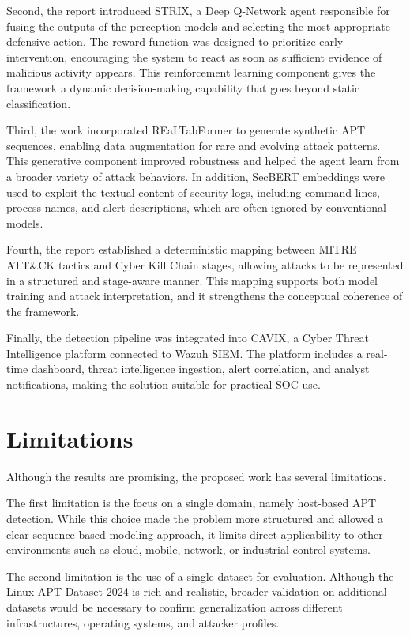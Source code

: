 Second, the report introduced STRIX, a Deep Q-Network agent responsible for fusing the outputs of the perception models and selecting the most appropriate defensive action. The reward function was designed to prioritize early intervention, encouraging the system to react as soon as sufficient evidence of malicious activity appears. This reinforcement learning component gives the framework a dynamic decision-making capability that goes beyond static classification.

Third, the work incorporated REaLTabFormer to generate synthetic APT sequences, enabling data augmentation for rare and evolving attack patterns. This generative component improved robustness and helped the agent learn from a broader variety of attack behaviors. In addition, SecBERT embeddings were used to exploit the textual content of security logs, including command lines, process names, and alert descriptions, which are often ignored by conventional models.

Fourth, the report established a deterministic mapping between MITRE ATT\&CK tactics and Cyber Kill Chain stages, allowing attacks to be represented in a structured and stage-aware manner. This mapping supports both model training and attack interpretation, and it strengthens the conceptual coherence of the framework.

Finally, the detection pipeline was integrated into CAVIX, a Cyber Threat Intelligence platform connected to Wazuh SIEM. The platform includes a real-time dashboard, threat intelligence ingestion, alert correlation, and analyst notifications, making the solution suitable for practical SOC use.

\section{Limitations}

Although the results are promising, the proposed work has several limitations.

The first limitation is the focus on a single domain, namely host-based APT detection. While this choice made the problem more structured and allowed a clear sequence-based modeling approach, it limits direct applicability to other environments such as cloud, mobile, network, or industrial control systems.

The second limitation is the use of a single dataset for evaluation. Although the Linux APT Dataset 2024 is rich and realistic, broader validation on additional datasets would be necessary to confirm generalization across different infrastructures, operating systems, and attacker profiles.

